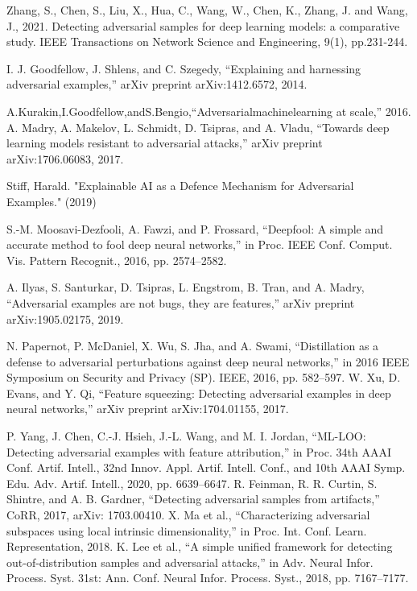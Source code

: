 \documentclass[10pt, conference, a4paper, final]{IEEEtran}
\begin{document}
\begin{thebibliography}{01}
    Zhang, S., Chen, S., Liu, X., Hua, C., Wang, W., Chen, K., Zhang, J. and Wang, J., 2021. Detecting adversarial samples for deep learning models: a comparative study. IEEE Transactions on Network Science and Engineering, 9(1), pp.231-244.

    I. J. Goodfellow, J. Shlens, and C. Szegedy, “Explaining and harnessing
    adversarial examples,” arXiv preprint arXiv:1412.6572, 2014.

    A.Kurakin,I.Goodfellow,andS.Bengio,“Adversarialmachinelearning at scale,” 2016.
    A. Madry, A. Makelov, L. Schmidt, D. Tsipras, and A. Vladu, “Towards deep learning models resistant to adversarial attacks,” arXiv preprint arXiv:1706.06083, 2017. 

    Stiff, Harald. "Explainable AI as a Defence Mechanism for Adversarial Examples." (2019)

    S.-M. Moosavi-Dezfooli, A. Fawzi, and P. Frossard, “Deepfool: A simple and accurate method to fool deep neural networks,” in Proc.
IEEE Conf. Comput. Vis. Pattern Recognit., 2016, pp. 2574–2582.

A. Ilyas, S. Santurkar, D. Tsipras, L. Engstrom, B. Tran, and A. Madry,
“Adversarial examples are not bugs, they are features,” arXiv preprint
arXiv:1905.02175, 2019.

N. Papernot, P. McDaniel, X. Wu, S. Jha, and A. Swami, “Distillation as a defense to adversarial perturbations against deep neural networks,” in 2016 IEEE Symposium on Security and Privacy (SP). IEEE, 2016, pp. 582–597.
W. Xu, D. Evans, and Y. Qi, “Feature squeezing: Detecting adversarial
examples in deep neural networks,” arXiv preprint arXiv:1704.01155,
2017.

 P. Yang, J. Chen, C.-J. Hsieh, J.-L. Wang, and M. I. Jordan, “ML-LOO:
Detecting adversarial examples with feature attribution,” in Proc. 34th AAAI Conf. Artif. Intell., 32nd Innov. Appl. Artif. Intell. Conf., and 10th AAAI Symp. Edu. Adv. Artif. Intell., 2020, pp. 6639–6647.
 R. Feinman, R. R. Curtin, S. Shintre, and A. B. Gardner, “Detecting adversarial samples from artifacts,” CoRR, 2017, arXiv: 1703.00410.
 X. Ma et al., “Characterizing adversarial subspaces using local intrinsic dimensionality,” in Proc. Int. Conf. Learn. Representation, 2018.
 K. Lee et al., “A simple unified framework for detecting out-of-distribution samples and adversarial attacks,” in Adv. Neural Infor. Process. Syst. 31st: Ann. Conf. Neural Infor. Process. Syst., 2018, pp. 7167–7177.


\end{thebibliography}
\end{document}
